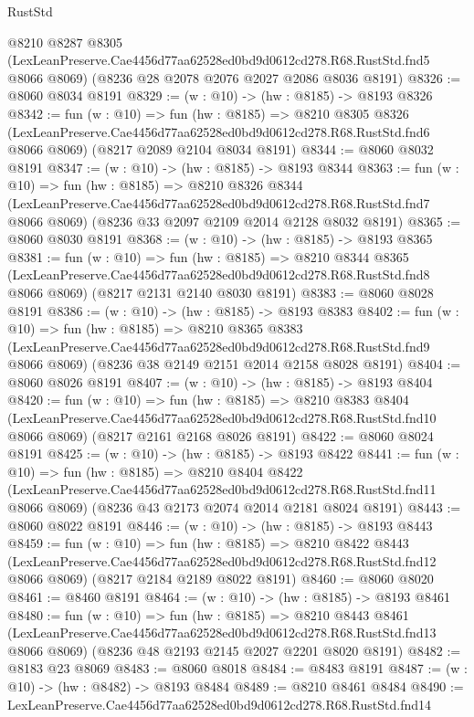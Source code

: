 \begin{lexlean}{RustStd}
\begin{coremodule}
  @8210
    @8287
    @8305
    (LexLeanPreserve.Cae4456d77aa62528ed0bd9d0612cd278.R68.RustStd.fnd5 @8066 @8069)
    (@8236 @28 @2078 @2076 @2027 @2086 @8036 @8191)
@8326 := @8060 @8034 @8191
@8329 := (w : @10) -> (hw : @8185) -> @8193 @8326
@8342 := fun (w : @10) =>
  fun (hw : @8185) =>
  @8210
    @8305
    @8326
    (LexLeanPreserve.Cae4456d77aa62528ed0bd9d0612cd278.R68.RustStd.fnd6 @8066 @8069)
    (@8217 @2089 @2104 @8034 @8191)
@8344 := @8060 @8032 @8191
@8347 := (w : @10) -> (hw : @8185) -> @8193 @8344
@8363 := fun (w : @10) =>
  fun (hw : @8185) =>
  @8210
    @8326
    @8344
    (LexLeanPreserve.Cae4456d77aa62528ed0bd9d0612cd278.R68.RustStd.fnd7 @8066 @8069)
    (@8236 @33 @2097 @2109 @2014 @2128 @8032 @8191)
@8365 := @8060 @8030 @8191
@8368 := (w : @10) -> (hw : @8185) -> @8193 @8365
@8381 := fun (w : @10) =>
  fun (hw : @8185) =>
  @8210
    @8344
    @8365
    (LexLeanPreserve.Cae4456d77aa62528ed0bd9d0612cd278.R68.RustStd.fnd8 @8066 @8069)
    (@8217 @2131 @2140 @8030 @8191)
@8383 := @8060 @8028 @8191
@8386 := (w : @10) -> (hw : @8185) -> @8193 @8383
@8402 := fun (w : @10) =>
  fun (hw : @8185) =>
  @8210
    @8365
    @8383
    (LexLeanPreserve.Cae4456d77aa62528ed0bd9d0612cd278.R68.RustStd.fnd9 @8066 @8069)
    (@8236 @38 @2149 @2151 @2014 @2158 @8028 @8191)
@8404 := @8060 @8026 @8191
@8407 := (w : @10) -> (hw : @8185) -> @8193 @8404
@8420 := fun (w : @10) =>
  fun (hw : @8185) =>
  @8210
    @8383
    @8404
    (LexLeanPreserve.Cae4456d77aa62528ed0bd9d0612cd278.R68.RustStd.fnd10 @8066 @8069)
    (@8217 @2161 @2168 @8026 @8191)
@8422 := @8060 @8024 @8191
@8425 := (w : @10) -> (hw : @8185) -> @8193 @8422
@8441 := fun (w : @10) =>
  fun (hw : @8185) =>
  @8210
    @8404
    @8422
    (LexLeanPreserve.Cae4456d77aa62528ed0bd9d0612cd278.R68.RustStd.fnd11 @8066 @8069)
    (@8236 @43 @2173 @2074 @2014 @2181 @8024 @8191)
@8443 := @8060 @8022 @8191
@8446 := (w : @10) -> (hw : @8185) -> @8193 @8443
@8459 := fun (w : @10) =>
  fun (hw : @8185) =>
  @8210
    @8422
    @8443
    (LexLeanPreserve.Cae4456d77aa62528ed0bd9d0612cd278.R68.RustStd.fnd12 @8066 @8069)
    (@8217 @2184 @2189 @8022 @8191)
@8460 := @8060 @8020
@8461 := @8460 @8191
@8464 := (w : @10) -> (hw : @8185) -> @8193 @8461
@8480 := fun (w : @10) =>
  fun (hw : @8185) =>
  @8210
    @8443
    @8461
    (LexLeanPreserve.Cae4456d77aa62528ed0bd9d0612cd278.R68.RustStd.fnd13 @8066 @8069)
    (@8236 @48 @2193 @2145 @2027 @2201 @8020 @8191)
@8482 := @8183 @23 @8069
@8483 := @8060 @8018
@8484 := @8483 @8191
@8487 := (w : @10) -> (hw : @8482) -> @8193 @8484
@8489 := @8210 @8461 @8484
@8490 := LexLeanPreserve.Cae4456d77aa62528ed0bd9d0612cd278.R68.RustStd.fnd14

\end{coremodule}
\end{lexlean}
